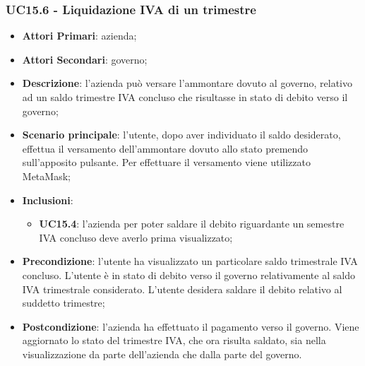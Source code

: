 \subsubsection{UC15.6 - Liquidazione IVA di un trimestre}
\begin{itemize}
	\item \textbf{Attori Primari}: azienda;
	\item \textbf{Attori Secondari}: governo;
	\item \textbf{Descrizione}: l'azienda può versare l'ammontare dovuto al governo, relativo ad un saldo trimestre IVA concluso che risultasse in stato di debito verso il governo;
	\item \textbf{Scenario principale}: l'utente, dopo aver individuato il saldo desiderato, effettua il versamento dell'ammontare dovuto allo stato premendo sull'apposito pulsante. Per effettuare il versamento viene utilizzato MetaMask\glo;
	\item \textbf{Inclusioni}:
	\begin{itemize}
		\item \textbf{UC15.4}: l'azienda per poter saldare il debito riguardante un semestre IVA concluso deve averlo prima visualizzato;
	\end{itemize}
	\item \textbf{Precondizione}: l'utente ha visualizzato un particolare saldo trimestrale IVA concluso. L'utente è in stato di debito verso il governo relativamente al saldo IVA trimestrale considerato. L'utente desidera saldare il debito relativo al suddetto trimestre; 
	\item \textbf{Postcondizione}: l'azienda ha effettuato il pagamento verso il governo. Viene aggiornato lo stato del trimestre IVA, che ora risulta saldato, sia nella visualizzazione da parte dell'azienda che dalla parte del governo.
\end{itemize} 

